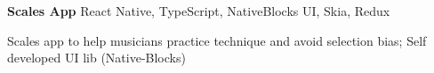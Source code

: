 \vspace{0.10 cm}
\begin{twocolentry_proj}{
    \mbox{}%
}
\fontsize{11 pt}{11 pt}\textbf{Scales App} React Native, TypeScript, NativeBlocks UI, Skia, Redux
\end{twocolentry_proj}
\begin{onecolentry}
    \begin{highlights}
        \item Scales app to help musicians practice technique and avoid selection bias; Self developed UI lib (Native-Blocks)
    \end{highlights}
\end{onecolentry}
